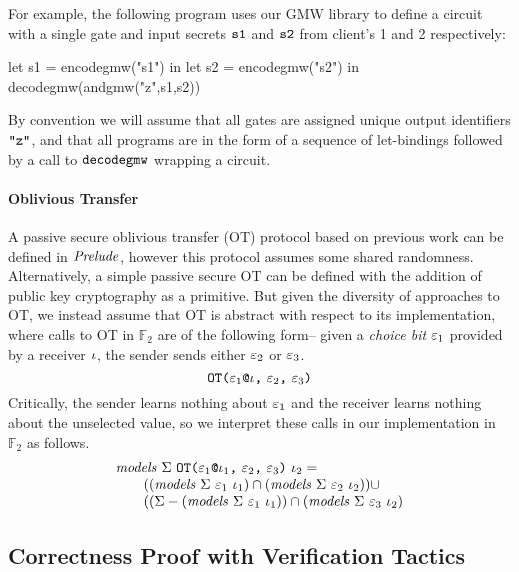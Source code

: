 For example, the following program uses our GMW library to define
a circuit with a single \eand gate and input secrets $\texttt{s1}$ and
$\texttt{s2}$ from client's 1 and 2 respectively:
\begin{verbatimtab}
         let s1 = encodegmw("s1") in
         let s2 = encodegmw("s2") in
         decodegmw(andgmw("z",s1,s2))
\end{verbatimtab}
By convention we will assume that all gates are assigned unique output
identifiers $\texttt{"z"}$, and that all programs are in the form
of a sequence of let-bindings followed by a call to $\texttt{decodegmw}$
wrapping a circuit.

\paragraph{Oblivious Transfer} A passive secure oblivious transfer (OT) protocol
based on previous work \cite{barthe2019probabilistic} can be defined in $\mathit{Prelude}$,
however this protocol assumes some shared randomness. Alternatively,
a simple passive secure OT can be defined with the addition of
public key cryptography as a primitive. But given the diversity
of approaches to OT, we instead assume that OT is abstract with
respect to its implementation, where calls to OT in $\mathbb{F}_2$
are of the following form-- given a \emph{choice bit}
$\varepsilon_1$ provided by a receiver $\iota$, the sender
sends either $\varepsilon_2$ or $\varepsilon_3$.
$$
\texttt{OT(} \varepsilon_1\texttt{@}\iota \texttt{,}\ \varepsilon_2 \texttt{,}\ \varepsilon_3 \texttt{)}
$$
Critically, the sender learns nothing about $\varepsilon_1$ and the
receiver learns nothing about the unselected value, so we interpret
these calls in our implementation in $\mathbb{F}_2$ as follows.
$$
\begin{array}{l}
\mathit{models}\ \Sigma\ \texttt{OT(} \varepsilon_1\texttt{@}\iota_1 \texttt{,}\ \varepsilon_2 \texttt{,}\ \varepsilon_3 \texttt{)}\ \iota_2 = \\
\qquad ((\mathit{models}\ \Sigma\ \varepsilon_1\ \iota_1) \cap 
(\mathit{models}\ \Sigma\ \varepsilon_2\ \iota_2)) \cup \\
\qquad ((\Sigma - (\mathit{models}\ \Sigma\ \varepsilon_1\ \iota_1)) \cap
(\mathit{models}\ \Sigma\ \varepsilon_3\ \iota_2)
\end{array}
$$

\subsection{Correctness Proof with Verification Tactics}

